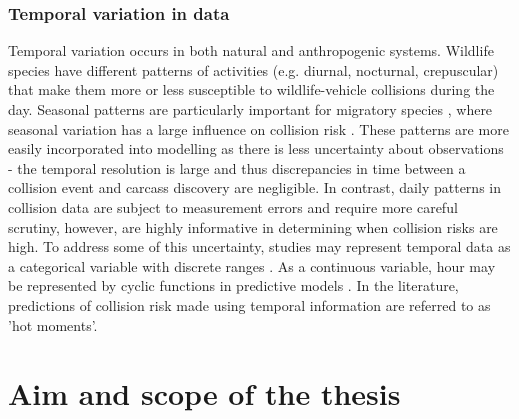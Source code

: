 \subsubsection{Temporal variation in data}

Temporal variation occurs in both natural and anthropogenic systems. Wildlife species have different patterns of activities (e.g. diurnal, nocturnal, crepuscular) that make them more or less susceptible to wildlife-vehicle collisions during the day. Seasonal patterns are particularly important for migratory species \citep{hick85,bern92}, where seasonal variation has a large influence on collision risk \citep{shep08}. These patterns are more easily incorporated into modelling as there is less uncertainty about observations - the temporal resolution is large and thus discrepancies in time between a collision event and carcass discovery are negligible. In contrast, daily patterns in collision data are subject to measurement errors and require more careful scrutiny, however, are highly informative in determining when collision risks are high. To address some of this uncertainty, studies may represent temporal data as a categorical variable \citep{mizu14} with discrete ranges \citep{rowd08}. As a continuous variable, hour may be represented by cyclic functions in predictive models \citep{neum12,thur15}. In the literature, predictions of collision risk made using temporal information are referred to as 'hot moments'.

\section{Aim and scope of the thesis}

